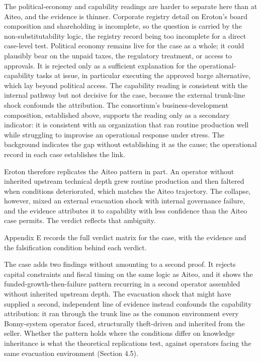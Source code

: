 The political-economy and capability readings are harder to separate
here than at Aiteo, and the evidence is thinner. Corporate registry
detail on Eroton's board composition and shareholding is incomplete, so
the question is carried by the non-substitutability logic, the registry
record being too incomplete for a direct case-level test. Political
economy remains live for the case as a whole; it could plausibly bear on
the unpaid taxes, the regulatory treatment, or access to approvals. It
is rejected only as a sufficient explanation for the
operational-capability tasks at issue, in particular executing the
approved barge alternative, which lay beyond political access. The
capability reading is consistent with the internal pathway but not
decisive for the case, because the external trunk-line shock confounds
the attribution. The consortium's business-development composition,
established above, supports the reading only as a secondary indicator:
it is consistent with an organization that ran routine production well
while struggling to improvise an operational response under stress. The
background indicates the gap without establishing it as the cause; the
operational record in each case establishes the link.

Eroton therefore replicates the Aiteo pattern in part. An operator
without inherited upstream technical depth grew routine production and
then faltered when conditions deteriorated, which matches the Aiteo
trajectory. The collapse, however, mixed an external evacuation shock
with internal governance failure, and the evidence attributes it to
capability with less confidence than the Aiteo case permits. The verdict
reflects that ambiguity.

Appendix E records the full verdict matrix for the case, with the
evidence and the falsification condition behind each verdict.

The case adds two findings without amounting to a second proof. It
rejects capital constraints and fiscal timing on the same logic as
Aiteo, and it shows the funded-growth-then-failure pattern recurring in
a second operator assembled without inherited upstream depth. The
evacuation shock that might have supplied a second, independent line of
evidence instead confounds the capability attribution: it ran through
the trunk line as the common environment every Bonny-system operator
faced, structurally theft-driven and inherited from the seller. Whether
the pattern holds where the conditions differ on knowledge inheritance
is what the theoretical replications test, against operators facing the
same evacuation environment (Section 4.5).


